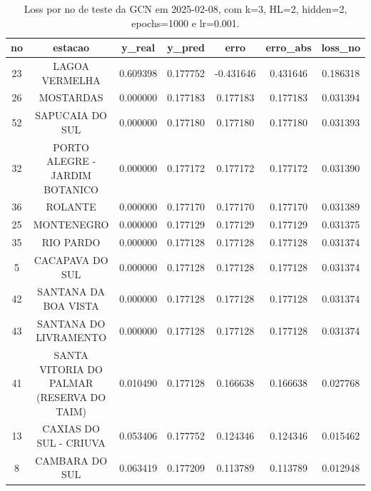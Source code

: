 \begin{table}[h]
\centering
\caption{Loss por no de teste da GCN em 2025-02-08, com k=3, HL=2, hidden=2, epochs=1000 e lr=0.001.}
\label{tab:gcn_loss_k3_hl2_h2_e1000_d20250208}
\begin{tabular}{ccccccc}
\toprule
no & estacao & y\_real & y\_pred & erro & erro\_abs & loss\_no \\
\midrule
23 & LAGOA VERMELHA & 0.609398 & 0.177752 & -0.431646 & 0.431646 & 0.186318 \\
26 & MOSTARDAS & 0.000000 & 0.177183 & 0.177183 & 0.177183 & 0.031394 \\
52 & SAPUCAIA DO SUL & 0.000000 & 0.177180 & 0.177180 & 0.177180 & 0.031393 \\
32 & PORTO ALEGRE - JARDIM BOTANICO & 0.000000 & 0.177172 & 0.177172 & 0.177172 & 0.031390 \\
36 & ROLANTE & 0.000000 & 0.177170 & 0.177170 & 0.177170 & 0.031389 \\
25 & MONTENEGRO & 0.000000 & 0.177129 & 0.177129 & 0.177129 & 0.031375 \\
35 & RIO PARDO & 0.000000 & 0.177128 & 0.177128 & 0.177128 & 0.031374 \\
5 & CACAPAVA DO SUL & 0.000000 & 0.177128 & 0.177128 & 0.177128 & 0.031374 \\
42 & SANTANA DA BOA VISTA & 0.000000 & 0.177128 & 0.177128 & 0.177128 & 0.031374 \\
43 & SANTANA DO LIVRAMENTO & 0.000000 & 0.177128 & 0.177128 & 0.177128 & 0.031374 \\
41 & SANTA VITORIA DO PALMAR (RESERVA DO TAIM) & 0.010490 & 0.177128 & 0.166638 & 0.166638 & 0.027768 \\
13 & CAXIAS DO SUL - CRIUVA & 0.053406 & 0.177752 & 0.124346 & 0.124346 & 0.015462 \\
8 & CAMBARA DO SUL & 0.063419 & 0.177209 & 0.113789 & 0.113789 & 0.012948 \\
\bottomrule
\end{tabular}
\end{table}
